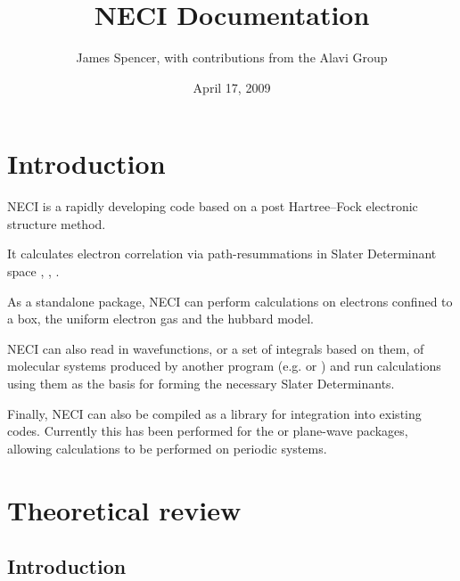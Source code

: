 \documentclass[openany,a4paper,10pt]{manual}
\title{NECI Documentation}
\date{April 17, 2009}
\author{James Spencer, with contributions from the Alavi Group}
\begin{document}
\maketitle
\tableofcontents



\resetcurrentobjects


\hypertarget{introduction}{}\chapter{Introduction}

NECI is a rapidly developing code based on a post Hartree--Fock electronic structure method.

It calculates electron correlation via path-resummations in Slater Determinant space \cite{SumPaper}, \cite{StarPaper}, \cite{ThomPhDThesis}.

As a standalone package, NECI can perform calculations on electrons confined to a box, the uniform electron gas and the hubbard model.

NECI can also read in wavefunctions, or a set of integrals based on them, of molecular systems produced by another program (e.g. \cite{DALTON} or \cite{MolPro}) and run calculations using them as the basis for forming the necessary Slater Determinants.

Finally, NECI can also be compiled as a library for integration into existing codes.  Currently this has been performed for the \cite{CPMD} or \cite{VASP} plane-wave packages, allowing calculations to be performed on periodic systems.

\resetcurrentobjects


\hypertarget{theory-index}{}\chapter{Theoretical review}

\resetcurrentobjects


\hypertarget{theory-introduction}{}\section{Introduction}
\end{document}
